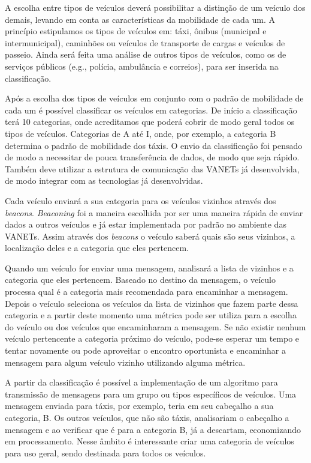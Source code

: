 \documentclass[mestrado, pre-defesa, english, brazil]{packages/icmc}
\begin{document}
A escolha entre tipos de veículos deverá possibilitar a distinção de um veículo dos demais, levando em conta as características da mobilidade de cada um. A princípio estipulamos os tipos de veículos em: táxi, ônibus (municipal e intermunicipal), caminhões ou veículos de transporte de cargas e veículos de passeio. Ainda será feita uma análise de outros tipos de veículos, como os de serviços públicos (e.g., polícia, ambulância e correios), para ser inserida na classificação.

Após a escolha dos tipos de veículos em conjunto com o padrão de mobilidade de cada um é possível classificar os veículos em categorias. De início a classificação terá 10 categorias, onde acreditamos que poderá cobrir de modo geral todos os tipos de veículos. Categorias de A até I, onde, por exemplo, a categoria B determina o padrão de mobilidade dos táxis. O envio da classificação foi pensado de modo a necessitar de pouca transferência de dados, de modo que seja rápido. Também deve utilizar a estrutura de comunicação das VANETs já desenvolvida, de modo integrar com as tecnologias já desenvolvidas.

Cada veículo enviará a sua categoria para os veículos vizinhos através dos \textit{beacons}. \textit{Beaconing} foi a maneira escolhida por ser uma maneira rápida de enviar dados a outros veículos e já estar implementada por padrão no ambiente das VANETs. Assim através dos \textit{beacons} o veículo saberá quais são seus vizinhos, a localização deles e a categoria que eles pertencem.

Quando um veículo for enviar uma mensagem, analisará a lista de vizinhos e a categoria que eles pertencem. Baseado no destino da mensagem, o veículo processa qual é a categoria mais recomendada para encaminhar a mensagem. Depois o veículo seleciona os veículos da lista de vizinhos que fazem parte dessa categoria e a partir deste momento uma métrica pode ser utiliza para a escolha do veículo ou dos veículos que encaminharam a mensagem. Se não existir nenhum veículo pertencente a categoria próximo do veículo, pode-se esperar um tempo e tentar novamente ou pode aproveitar o encontro oportunista e encaminhar a mensagem para algum veículo vizinho utilizando alguma métrica.

A partir da classificação é possível a implementação de um algoritmo para transmissão de mensagens para um grupo ou tipos específicos de veículos. Uma mensagem enviada para táxis, por exemplo, teria em seu cabeçalho a sua categoria, B. Os outros veículos, que não são táxis, analisariam o cabeçalho a mensagem e ao verificar que é para a categoria B, já a descartam, economizando em processamento. Nesse âmbito é interessante criar uma categoria de veículos para uso geral, sendo destinada para todos os veículos.
\end{document}
